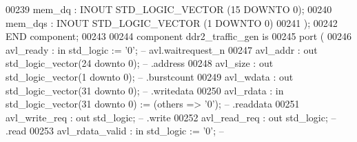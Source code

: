 \begin{DoxyCode}
00239         mem_dq              : \textcolor{keywordflow}{INOUT} \textcolor{comment}{STD\_LOGIC\_VECTOR} (\textcolor{vhdllogic}{}\textcolor{vhdllogic}{15} \textcolor{keywordflow}{DOWNTO} \textcolor{vhdllogic}{}\textcolor{vhdllogic}{0});
00240         mem_dqs             : \textcolor{keywordflow}{INOUT} \textcolor{comment}{STD\_LOGIC\_VECTOR} (\textcolor{vhdllogic}{}\textcolor{vhdllogic}{1} \textcolor{keywordflow}{DOWNTO} \textcolor{vhdllogic}{}\textcolor{vhdllogic}{0})
00241     );
00242 \textcolor{keywordflow}{END} \textcolor{keywordflow}{component};
00243 
00244 \textcolor{keywordflow}{component} ddr2\_traffic\_gen \textcolor{keywordflow}{is}
00245     \textcolor{keywordflow}{port} (
00246         avl\_ready           : \textcolor{keywordflow}{in}  \textcolor{comment}{std\_logic}                     := '\textcolor{vhdllogic}{}\textcolor{vhdllogic}{0}';             \textcolor{keyword}{--      
       avl.waitrequest\_n}
00247         avl\_addr            : \textcolor{keywordflow}{out} \textcolor{comment}{std\_logic\_vector}(\textcolor{vhdllogic}{}\textcolor{vhdllogic}{24} \textcolor{keywordflow}{downto} \textcolor{vhdllogic}{}\textcolor{vhdllogic}{0});                    \textcolor{keyword}{--          .address}
00248         avl\_size            : \textcolor{keywordflow}{out} \textcolor{comment}{std\_logic\_vector}(\textcolor{vhdllogic}{}\textcolor{vhdllogic}{1} \textcolor{keywordflow}{downto} \textcolor{vhdllogic}{}\textcolor{vhdllogic}{0});                     \textcolor{keyword}{--          .burstcount}
00249         avl\_wdata           : \textcolor{keywordflow}{out} \textcolor{comment}{std\_logic\_vector}(\textcolor{vhdllogic}{}\textcolor{vhdllogic}{31} \textcolor{keywordflow}{downto} \textcolor{vhdllogic}{}\textcolor{vhdllogic}{0});                    \textcolor{keyword}{--          .writedata}
00250         avl\_rdata           : \textcolor{keywordflow}{in}  \textcolor{comment}{std\_logic\_vector}(\textcolor{vhdllogic}{}\textcolor{vhdllogic}{31} \textcolor{keywordflow}{downto} \textcolor{vhdllogic}{}\textcolor{vhdllogic}{0}) := (\textcolor{keywordflow}{others} => '\textcolor{vhdllogic}{}\textcolor{vhdllogic}{0}'); \textcolor{keyword}{--          .readdata}
00251         avl\_write\_req       : \textcolor{keywordflow}{out} \textcolor{comment}{std\_logic};                                        \textcolor{keyword}{--          .write}
00252         avl\_read\_req        : \textcolor{keywordflow}{out} \textcolor{comment}{std\_logic};                                        \textcolor{keyword}{--          .read}
00253         avl\_rdata\_valid     : \textcolor{keywordflow}{in}  \textcolor{comment}{std\_logic}                     := '\textcolor{vhdllogic}{}\textcolor{vhdllogic}{0}';             \textcolor{keyword}{--         
}
\end{DoxyCode}
